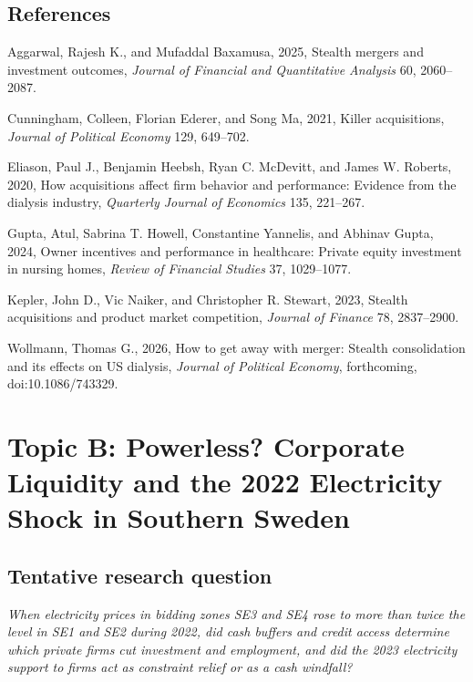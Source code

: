 \documentclass[12pt,a4paper]{article}
\newenvironment{refs}{\begin{list}{}{\setlength{\leftmargin}{1.5em}\setlength{\itemindent}{-1.5em}\setlength{\itemsep}{1pt}}}{\end{list}}
\begin{document}
\subsection*{References}
\begin{refs}
\item Aggarwal, Rajesh K., and Mufaddal Baxamusa, 2025, Stealth mergers and investment outcomes, \emph{Journal of Financial and Quantitative Analysis} 60, 2060--2087.
\item Cunningham, Colleen, Florian Ederer, and Song Ma, 2021, Killer acquisitions, \emph{Journal of Political Economy} 129, 649--702.
\item Eliason, Paul J., Benjamin Heebsh, Ryan C. McDevitt, and James W. Roberts, 2020, How acquisitions affect firm behavior and performance: Evidence from the dialysis industry, \emph{Quarterly Journal of Economics} 135, 221--267.
\item Gupta, Atul, Sabrina T. Howell, Constantine Yannelis, and Abhinav Gupta, 2024, Owner incentives and performance in healthcare: Private equity investment in nursing homes, \emph{Review of Financial Studies} 37, 1029--1077.
\item Kepler, John D., Vic Naiker, and Christopher R. Stewart, 2023, Stealth acquisitions and product market competition, \emph{Journal of Finance} 78, 2837--2900.
\item Wollmann, Thomas G., 2026, How to get away with merger: Stealth consolidation and its effects on US dialysis, \emph{Journal of Political Economy}, forthcoming, doi:10.1086/743329.
\end{refs}

\newpage

\section{Topic B: Powerless? Corporate Liquidity and the 2022 Electricity Shock in Southern Sweden}

\subsection{Tentative research question}

\emph{When electricity prices in bidding zones SE3 and SE4 rose to more than twice the level in SE1 and SE2 during 2022, did cash buffers and credit access determine which private firms cut investment and employment, and did the 2023 electricity support to firms act as constraint relief or as a cash windfall?}
\end{document}
